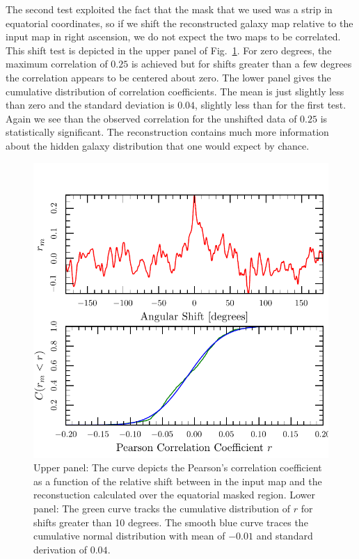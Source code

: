 \documentclass[useAMS,usenatbib]{mn2e}
\begin{document}
The second test exploited the fact that the mask that we used was a
strip in equatorial coordinates, so if we shift the reconstructed
galaxy map relative to the input map in right ascension, we do not
expect the two maps to be correlated.  This shift test is depicted in
the upper panel of Fig.~\ref{fig:shift_test}.  For zero degrees, the
maximum correlation of $0.25$ is achieved but for shifts greater than
a few degrees the correlation appears to be centered about zero.  The
lower panel gives the cumulative distribution of correlation
coefficients.  The mean is just slightly less than zero and the
standard deviation is $0.04$, slightly less than for the first test.
Again we see than the observed correlation for the unshifted data of
$0.25$ is statistically significant.  The reconstruction contains much
more information about the hidden galaxy distribution that one would
expect by chance.
\begin{figure}
  \includegraphics[width=\columnwidth]{ang_combo}
  \caption{Upper panel: The curve depicts the Pearson's correlation
    coefficient as a function of the relative shift between in the
    input map and the reconstuction calculated over the equatorial
    masked region. Lower panel: The green curve tracks the cumulative
    distribution of $r$ for shifts greater than 10 degrees.  The
    smooth blue curve traces the cumulative normal distribution with
    mean of $-0.01$ and standard derivation of $0.04$.}
  \label{fig:shift_test}
\end{figure}
\end{document}
